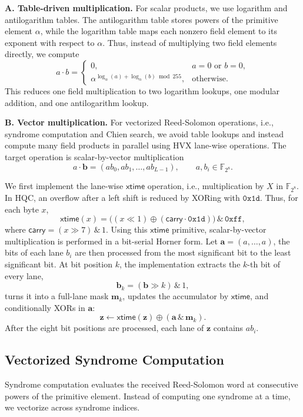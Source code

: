 \documentclass[12pt,a4paper]{report}
\begin{document}
\noindent\textbf{A. Table-driven multiplication.}
\label{sec:gf-mul}
For scalar products, we use logarithm and antilogarithm tables. The antilogarithm
table stores powers of the primitive element \(\alpha\), while the logarithm
table maps each nonzero field element to its exponent with respect to
\(\alpha\). Thus, instead of multiplying two field elements directly, we compute
\[
    a\cdot b =
    \begin{cases}
        0, & a=0 \text{ or } b=0,\\
        \alpha^{\log_\alpha(a)+\log_\alpha(b) \bmod 255}, & \text{otherwise}.
    \end{cases}
\]
This reduces one field multiplication to two logarithm lookups, one modular
addition, and one antilogarithm lookup.

\noindent\textbf{B. Vector multiplication.}
For vectorized Reed-Solomon operations, i.e., syndrome computation and Chien search, we
avoid table lookups and instead compute many field products in parallel using
HVX lane-wise operations. The target operation is scalar-by-vector
multiplication
\[
    a\cdot \mathbf b
    =
    (a b_0, a b_1,\ldots,a b_{L-1}),
    \qquad
    a,b_i\in \mathbb F_{2^8}.
\]

We first implement the lane-wise \(\mathsf{xtime}\) operation, i.e.,
multiplication by \(X\) in \(\mathbb F_{2^8}\). In HQC, an overflow after a left shift is reduced by XORing with
\(\mathtt{0x1d}\). Thus, for each byte \(x\),
\[
    \mathsf{xtime}(x)
    =
    \bigl((x \ll 1) \oplus (\mathsf{carry}\cdot \mathtt{0x1d})\bigr)
    \,\&\, \mathtt{0xff},
\]
where
$\mathsf{carry}=(x\gg 7)\,\&\,1.$
Using this \(\mathsf{xtime}\) primitive, scalar-by-vector multiplication is
performed in a bit-serial Horner form. Let $\mathbf{a}=(a,\dots,a)$, the bits of each lane \(b_i\) are then processed from the most significant bit
to the least significant bit. At bit position \(k\), the implementation extracts
the \(k\)-th bit of every lane,
\[
    \mathbf b_k=(\mathbf b\gg k)\,\&\,1,
\]
turns it into a full-lane mask \(\mathbf m_k\), updates the accumulator by
\(\mathsf{xtime}\), and conditionally XORs in \(\mathbf a\):
\[
    \mathbf z
    \leftarrow
    \mathsf{xtime}(\mathbf z)
    \oplus
    (\mathbf a\,\&\,\mathbf m_k).
\]
After the eight bit positions are processed, each lane of \(\mathbf z\)
contains \(a b_i\).

\subsection{Vectorized Syndrome Computation}
Syndrome computation evaluates the received Reed-Solomon word at consecutive powers of
the primitive element. Instead of computing one syndrome at a time, we vectorize
across syndrome indices.
\end{document}
